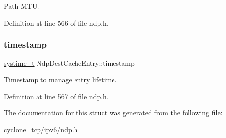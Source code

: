 Path M\+TU. 



Definition at line 566 of file ndp.\+h.

\mbox{\label{structNdpDestCacheEntry_a8474c35e89cb368fafe1e73ce9210f34}} 
\subsubsection{\texorpdfstring{timestamp}{timestamp}}
{\footnotesize\ttfamily \hyperlink{compiler__port_8h_ae3e32a98d431a02106616da3071832dd}{systime\+\_\+t} Ndp\+Dest\+Cache\+Entry\+::timestamp}



Timestamp to manage entry lifetime. 



Definition at line 567 of file ndp.\+h.



The documentation for this struct was generated from the following file\+:\begin{DoxyCompactItemize}
\item 
cyclone\+\_\+tcp/ipv6/\hyperlink{ndp_8h}{ndp.\+h}\end{DoxyCompactItemize}
